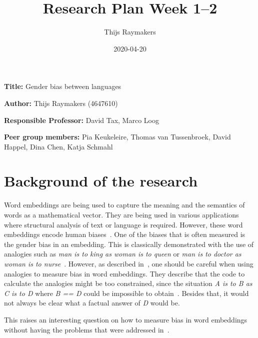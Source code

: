 \documentclass[english, a4paper, 11pt]{article}
\title{Research Plan Week 1--2}
\author{Thijs Raymakers}
\date{2020-04-20}
\newcommand{\namelistlabel}[1]{\mbox{#1}\hfil}
\newenvironment{namelist}[1]{%
\begin{list}{}
    {
        \let\makelabel\namelistlabel
        \settowidth{\labelwidth}{#1}
        \setlength{\leftmargin}{1.1\labelwidth}
    }
  }{%
\end{list}}
\begin{document}
\maketitle

\begin{namelist}{xxxxxxxxxxxxxxxxxxxxxxxxxxxxxxxxxxxxxxx}
\item[{\bf Title:}]
    Gender bias between languages
\item[{\bf Author:}]
    Thijs Raymakers (4647610)
\item[{\bf Responsible Professor:}]
    David Tax, Marco Loog
\item[{\bf Peer group members:}]
    Pia Keukeleire, 
    Thomas van Tussenbroek,
    David Happel,
    Dina Chen,
    Katja Schmahl
\end{namelist}


\section*{Background of the research}
Word embeddings are being used to capture the meaning and the semantics of words as a
mathematical vector. They are being used in various applications where structural
analysis of text or language is required. However, these word embeddings encode
human biases~\cite{caliskan_2017_semantics_language_corpora, 2019arXiv190509866N, 2017arXiv171108412G, 2018arXiv180309288K, 2019arXiv190303862G}. One of the biases that is often
measured is the gender bias in an embedding. This is classically demonstrated with the
use of analogies such as \textit{man is to king as woman is to queen} or \textit{man is to doctor as woman is to nurse}~\cite{2019arXiv190509866N}.
However, as described in~\cite{2019arXiv190509866N}, one should be careful when using
analogies to measure bias in word embeddings. They describe that the code to calculate
the analogies might be too constrained, since the situation \textit{A is to B as C is to D}
where \textit{B == D} could be impossible to obtain~\cite{2019arXiv190509866N}. Besides
that, it would not always be clear what a factual answer of \textit{D} would be.

This raises an interesting question on how to measure bias in word embeddings without
having the problems that were addressed in~\cite{2019arXiv190509866N}.
\end{document}
